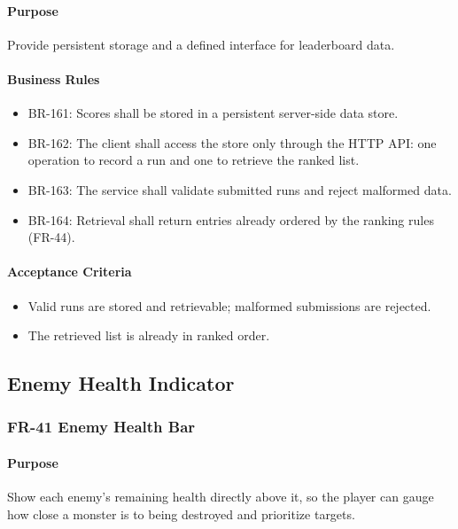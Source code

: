 \documentclass[11pt,a4paper]{article}
\begin{document}
\paragraph{Purpose}
Provide persistent storage and a defined interface for leaderboard data.

\paragraph{Business Rules}
\begin{itemize}
  \item BR-161: Scores shall be stored in a persistent server-side data store.
  \item BR-162: The client shall access the store only through the HTTP API: one
        operation to record a run and one to retrieve the ranked list.
  \item BR-163: The service shall validate submitted runs and reject malformed
        data.
  \item BR-164: Retrieval shall return entries already ordered by the ranking
        rules (FR-44).
\end{itemize}

\paragraph{Acceptance Criteria}
\begin{itemize}
  \item Valid runs are stored and retrievable; malformed submissions are rejected.
  \item The retrieved list is already in ranked order.
\end{itemize}

\subsection{Enemy Health Indicator}

\subsubsection{FR-41 Enemy Health Bar}

\paragraph{Purpose}
Show each enemy's remaining health directly above it, so the player can gauge how
close a monster is to being destroyed and prioritize targets.
\end{document}
